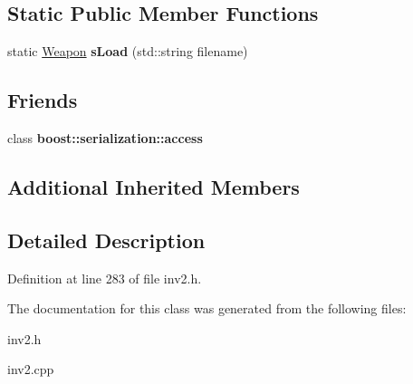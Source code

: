 \subsection*{Static Public Member Functions}
\begin{DoxyCompactItemize}
\item 
\hypertarget{class_weapon_a4dd598f04fed0db98db6e4d4a3cd8e23}{}\label{class_weapon_a4dd598f04fed0db98db6e4d4a3cd8e23} 
static \hyperlink{class_weapon}{Weapon} {\bfseries s\+Load} (std\+::string filename)
\end{DoxyCompactItemize}
\subsection*{Friends}
\begin{DoxyCompactItemize}
\item 
\hypertarget{class_weapon_ac98d07dd8f7b70e16ccb9a01abf56b9c}{}\label{class_weapon_ac98d07dd8f7b70e16ccb9a01abf56b9c} 
class {\bfseries boost\+::serialization\+::access}
\end{DoxyCompactItemize}
\subsection*{Additional Inherited Members}


\subsection{Detailed Description}


Definition at line 283 of file inv2.\+h.



The documentation for this class was generated from the following files\+:\begin{DoxyCompactItemize}
\item 
inv2.\+h\item 
inv2.\+cpp\end{DoxyCompactItemize}
